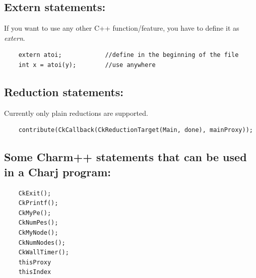 \documentclass[11pt]{article}
\begin{document}
\subsection{Extern statements: }
If you want to use any other C++ function/feature, you have to define it as {\it extern}.

\begin{verbatim}
	extern atoi;			//define in the beginning of the file
	int x = atoi(y);		//use anywhere
\end{verbatim}

\subsection{Reduction statements:}
Currently only plain reductions are supported.

\begin{verbatim}
	contribute(CkCallback(CkReductionTarget(Main, done), mainProxy));
\end{verbatim}

\subsection{Some Charm++ statements that can be used in a Charj program:}

\begin{verbatim}
	CkExit();
	CkPrintf();
	CkMyPe();
	CkNumPes();
	CkMyNode();
	CkNumNodes();
	CkWallTimer();
	thisProxy
	thisIndex
\end{verbatim}
\end{document}
